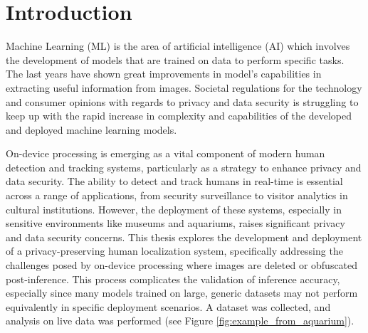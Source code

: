 \section{Introduction}
\label{sec:introduction}
Machine Learning (ML) is the area of artificial intelligence (AI) which involves the development of models that are trained on data to perform specific tasks. The last years have shown great improvements in model's capabilities in extracting useful information from images. Societal regulations for the technology and consumer opinions with regards to privacy and data security is struggling to keep up with the rapid increase in complexity and capabilities of the developed and deployed machine learning models. 

On-device processing is emerging as a vital component of modern human detection and tracking systems, particularly as a strategy to enhance privacy and data security. The ability to detect and track humans in real-time is essential across a range of applications, from security surveillance to visitor analytics in cultural institutions. However, the deployment of these systems, especially in sensitive environments like museums and aquariums, raises significant privacy and data security concerns. This thesis explores the development and deployment of a privacy-preserving human localization system, specifically addressing the challenges posed by on-device processing where images are deleted or obfuscated post-inference. This process complicates the validation of inference accuracy, especially since many models trained on large, generic datasets may not perform equivalently in specific deployment scenarios. A dataset was collected, and analysis on live data was performed (see Figure \ref{fig:example_from_aquarium}).

